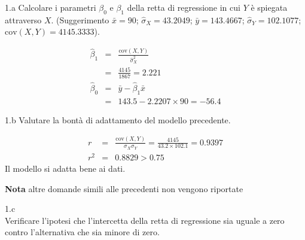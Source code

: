 \documentclass[
  11pt,
]{book}
\theoremstyle{mytheoremstyle}
\theoremstyle{mydefstyle}
\newenvironment{sol}
  {
  \begin{tcolorbox}[enhanced,breakable,arc=0.1mm,boxrule=1pt,colback=white,colframe=iblue,
  title=\bf \fontfamily{lmss}\selectfont \hspace{.5 cm} Soluzione,drop fuzzy shadow]

}{
\end{tcolorbox}
  }
\begin{document}
1.a Calcolare i parametri \(\beta_{0}\) e \(\beta_{1}\)
della retta di regressione in cui \(Y\) è spiegata attraverso \(X\).
(Suggerimento \(\bar{x} = 90\); \(\hat\sigma_{X} = 43.2049\);
\(\bar{y} = 143.4667\); \(\hat\sigma_{Y} = 102.1077\); \(\text{cov}(X,Y)= 4145.3333\)).

\begin{sol}
\begin{eqnarray*}
       \hat\beta_1 &=& \frac{\text{cov}(X,Y)}{\hat\sigma_X^2} \\
            &=& \frac{ 4145 }{ 1867 }  =  2.221 \\
      \hat\beta_0 &=& \bar y - \hat\beta_1 \bar x\\
          &=&  143.5 - 2.2207 \times  90 = -56.4 
      \end{eqnarray*}

\end{sol}

1.b Valutare la bontà di adattamento del modello precedente.

\begin{sol}
\begin{eqnarray*}
r&=&\frac{\text{cov}(X,Y)}{\sigma_X\sigma_Y}=\frac{ 4145 }{ 43.2 \times 102.1 }= 0.9397 \\r^2&=& 0.8829 > 0.75
\end{eqnarray*}
Il modello si adatta bene ai dati.

\end{sol}

\textbf{Nota} altre domande simili alle precedenti non vengono riportate

1.c\\
Verificare l'ipotesi che l'intercetta della retta di
regressione sia uguale a zero contro l'alternativa che sia
minore di zero.
\end{document}
